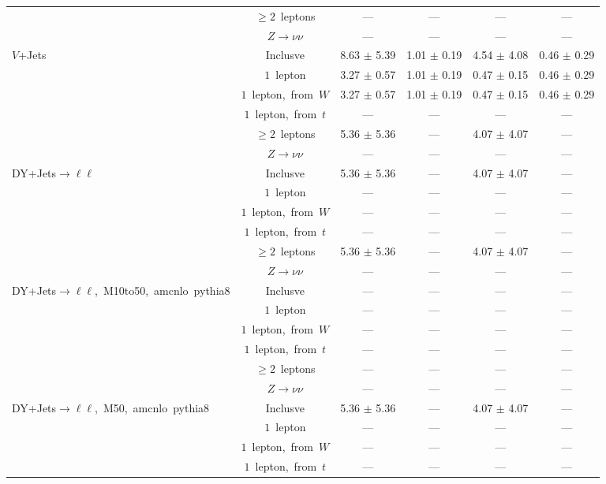 \documentclass{article}
\begin{document}
\begin{longtable}{|l|c|c|c|c|c|}
 & $\ge2$~leptons  & ---  & ---  & ---  & --- \\* 
 & $Z\rightarrow\nu\nu$  & ---  & ---  & ---  & --- \\* 
\hline 
\multirow{6}{*}{$V$+Jets} & Inclusve  & 8.63 $\pm$ 5.39  & 1.01 $\pm$ 0.19  & 4.54 $\pm$ 4.08  & 0.46 $\pm$ 0.29 \\* 
 & $1$~lepton  & 3.27 $\pm$ 0.57  & 1.01 $\pm$ 0.19  & 0.47 $\pm$ 0.15  & 0.46 $\pm$ 0.29 \\* 
 & $1$~lepton,~from~$W$  & 3.27 $\pm$ 0.57  & 1.01 $\pm$ 0.19  & 0.47 $\pm$ 0.15  & 0.46 $\pm$ 0.29 \\* 
 & $1$~lepton,~from~$t$  & ---  & ---  & ---  & --- \\* 
 & $\ge2$~leptons  & 5.36 $\pm$ 5.36  & ---  & 4.07 $\pm$ 4.07  & --- \\* 
 & $Z\rightarrow\nu\nu$  & ---  & ---  & ---  & --- \\* 
\hline 
\multirow{6}{*}{DY+Jets$\rightarrow\ell\ell$} & Inclusve  & 5.36 $\pm$ 5.36  & ---  & 4.07 $\pm$ 4.07  & --- \\* 
 & $1$~lepton  & ---  & ---  & ---  & --- \\* 
 & $1$~lepton,~from~$W$  & ---  & ---  & ---  & --- \\* 
 & $1$~lepton,~from~$t$  & ---  & ---  & ---  & --- \\* 
 & $\ge2$~leptons  & 5.36 $\pm$ 5.36  & ---  & 4.07 $\pm$ 4.07  & --- \\* 
 & $Z\rightarrow\nu\nu$  & ---  & ---  & ---  & --- \\* 
\hline 
\multirow{6}{*}{DY+Jets$\rightarrow\ell\ell$,~M10to50,~amcnlo~pythia8} & Inclusve  & ---  & ---  & ---  & --- \\* 
 & $1$~lepton  & ---  & ---  & ---  & --- \\* 
 & $1$~lepton,~from~$W$  & ---  & ---  & ---  & --- \\* 
 & $1$~lepton,~from~$t$  & ---  & ---  & ---  & --- \\* 
 & $\ge2$~leptons  & ---  & ---  & ---  & --- \\* 
 & $Z\rightarrow\nu\nu$  & ---  & ---  & ---  & --- \\* 
\hline 
\multirow{6}{*}{DY+Jets$\rightarrow\ell\ell$,~M50,~amcnlo~pythia8} & Inclusve  & 5.36 $\pm$ 5.36  & ---  & 4.07 $\pm$ 4.07  & --- \\* 
 & $1$~lepton  & ---  & ---  & ---  & --- \\* 
 & $1$~lepton,~from~$W$  & ---  & ---  & ---  & --- \\* 
 & $1$~lepton,~from~$t$  & ---  & ---  & ---  & --- \\* 

\end{longtable}
\end{document}

